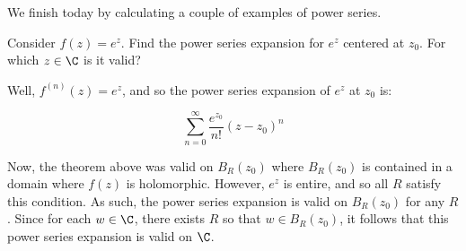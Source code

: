 We finish today by calculating a couple of examples of power series.

\begin{ex}{}{} Consider $f(z) = e^z$. Find the power series expansion for $e^z$ centered at $z_0$. For which $z\in \C$ is it valid?

Well, $f^{(n)}(z) = e^z$, and so the power series expansion of $e^z$ at $z_0$ is:

$$\sum_{n = 0}^\infty \frac{e^{z_0}}{n!}(z-z_0)^n$$

Now, the theorem above was valid on $B_R(z_0)$ where $B_R(z_0)$ is contained in a domain where $f(z)$ is holomorphic. However, $e^z$ is entire, and so all $R$ satisfy this condition. As such, the power series expansion is valid on $B_R(z_0)$ for any $R$. Since for each $w\in \C$, there exists $R$ so that $w\in B_R(z_0)$, it follows that this power series expansion is valid on $\C$.
\end{ex}